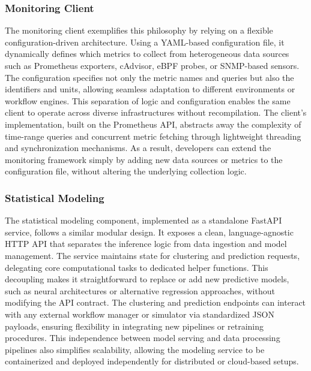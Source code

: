 \subsubsection{Monitoring Client}
\label{sec:monitoring_client}
The monitoring client exemplifies this philosophy by relying on a flexible configuration-driven architecture. Using a YAML-based configuration file, it dynamically defines which metrics to collect from heterogeneous data sources such as Prometheus exporters, cAdvisor, eBPF probes, or SNMP-based sensors. The configuration specifies not only the metric names and queries but also the identifiers and units, allowing seamless adaptation to different environments or workflow engines. This separation of logic and configuration enables the same client to operate across diverse infrastructures without recompilation. The client’s implementation, built on the Prometheus API, abstracts away the complexity of time-range queries and concurrent metric fetching through lightweight threading and synchronization mechanisms. As a result, developers can extend the monitoring framework simply by adding new data sources or metrics to the configuration file, without altering the underlying collection logic.
\subsubsection{Statistical Modeling}
\label{sec:statistical_modeling}
The statistical modeling component, implemented as a standalone FastAPI service, follows a similar modular design. It exposes a clean, language-agnostic HTTP API that separates the inference logic from data ingestion and model management. The service maintains state for clustering and prediction requests, delegating core computational tasks to dedicated helper functions. This decoupling makes it straightforward to replace or add new predictive models, such as neural architectures or alternative regression approaches, without modifying the API contract. The clustering and prediction endpoints can interact with any external workflow manager or simulator via standardized JSON payloads, ensuring flexibility in integrating new pipelines or retraining procedures. This independence between model serving and data processing pipelines also simplifies scalability, allowing the modeling service to be containerized and deployed independently for distributed or cloud-based setups.


